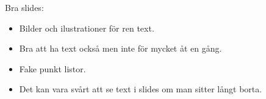 \begin{multicols}{2}
Bra slides:
\begin{itemize}
\item Bilder och ilustrationer för ren text.
\item Bra att ha text också men inte för mycket åt en gång.
\item Fake punkt listor.
  \item Det kan vara svårt att se text i slides om man sitter långt borta.
\end{itemize}



%
%
%
%
%
%
%
%
%
%
%
%
%
%
%
%
%
\end{multicols}
\raggedcolumns